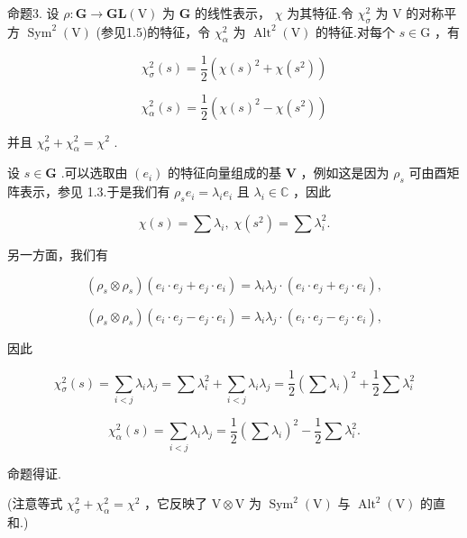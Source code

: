 命题3. 设 \(\rho  : \mathbf{G} \rightarrow  \mathbf{{GL}}\left( \mathrm{V}\right)\) 为 \(\mathbf{G}\) 的线性表示， \(\chi\) 为其特征.令 \({\chi }_{\sigma }^{2}\) 为 \(\mathrm{V}\) 的对称平方 \({\operatorname{Sym}}^{2}\left( \mathrm{V}\right)\) (参见1.5)的特征，令 \({\chi }_{\alpha }^{2}\) 为 \({\operatorname{Alt}}^{2}\left( \mathrm{V}\right)\) 的特征.对每个 \(s \in  \mathrm{G}\) ，有

\[
{\chi }_{\sigma }^{2}\left( s\right)  = \frac{1}{2}\left( {\chi {\left( s\right) }^{2} + \chi \left( {s}^{2}\right) }\right)
\]

\[
{\chi }_{\alpha }^{2}\left( s\right)  = \frac{1}{2}\left( {\chi {\left( s\right) }^{2} - \chi \left( {s}^{2}\right) }\right)
\]

并且 \({\chi }_{\sigma }^{2} + {\chi }_{\alpha }^{2} = {\chi }^{2}\) .

设 \(s \in  \mathbf{G}\) .可以选取由 \(\left( {e}_{i}\right)\) 的特征向量组成的基 \(\mathbf{V}\) ，例如这是因为 \({\rho }_{s}\) 可由酉矩阵表示，参见 1.3.于是我们有 \({\rho }_{s}{e}_{i} = {\lambda }_{i}{e}_{i}\) 且 \({\lambda }_{i} \in  \mathbb{C}\) ，因此

\[
\chi \left( s\right)  = \sum {\lambda }_{i},\;\chi \left( {s}^{2}\right)  = \sum {\lambda }_{i}^{2}.
\]

另一方面，我们有

\[
\left( {{\rho }_{s} \otimes  {\rho }_{s}}\right) \left( {{e}_{i} \cdot  {e}_{j} + {e}_{j} \cdot  {e}_{i}}\right)  = {\lambda }_{i}{\lambda }_{j} \cdot  \left( {{e}_{i} \cdot  {e}_{j} + {e}_{j} \cdot  {e}_{i}}\right) ,
\]

\[
\left( {{\rho }_{s} \otimes  {\rho }_{s}}\right) \left( {{e}_{i} \cdot  {e}_{j} - {e}_{j} \cdot  {e}_{i}}\right)  = {\lambda }_{i}{\lambda }_{j} \cdot  \left( {{e}_{i} \cdot  {e}_{j} - {e}_{j} \cdot  {e}_{i}}\right) ,
\]

因此

\[
{\chi }_{\sigma }^{2}\left( s\right)  = \mathop{\sum }\limits_{{i < j}}{\lambda }_{i}{\lambda }_{j} = \sum {\lambda }_{i}^{2} + \mathop{\sum }\limits_{{i < j}}{\lambda }_{i}{\lambda }_{j} = \frac{1}{2}{\left( \sum {\lambda }_{i}\right) }^{2} + \frac{1}{2}\sum {\lambda }_{i}^{2}
\]

\[
{\chi }_{\alpha }^{2}\left( s\right)  = \mathop{\sum }\limits_{{i < j}}{\lambda }_{i}{\lambda }_{j} = \frac{1}{2}{\left( \sum {\lambda }_{i}\right) }^{2} - \frac{1}{2}\sum {\lambda }_{i}^{2}.
\]

命题得证.

(注意等式 \({\chi }_{\sigma }^{2} + {\chi }_{\alpha }^{2} = {\chi }^{2}\) ，它反映了 \(\mathrm{V} \otimes  \mathrm{V}\) 为 \({\operatorname{Sym}}^{2}\left( \mathrm{V}\right)\) 与 \({\operatorname{Alt}}^{2}\left( \mathrm{V}\right)\) 的直和.)

